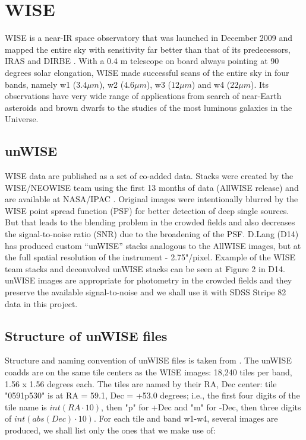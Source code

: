 \section{WISE}

WISE \citep{Wright2010} is a near-IR space observatory that was launched in December 2009 and mapped the entire sky with sensitivity far better than that of its predecessors, IRAS \citep{Neugebauer1984} and DIRBE \citep{Silverberg1993}. With a 0.4 m telescope on board always pointing at 90 degrees solar elongation, WISE made successful scans of the entire sky in four bands, namely w1 ($3.4 \mu m$), w2 ($4.6 \mu m$), w3 ($12 \mu m$) and w4 ($22 \mu m$). Its observations have very wide range of applications from search of near-Earth asteroids and brown dwarfs to the studies of the most luminous galaxies in the Universe.

\subsection{unWISE}

WISE data are published as a set of co-added data. Stacks were created by the WISE/NEOWISE team using the first 13 months of data (AllWISE release) and are available at NASA/IPAC . Original images were intentionally blurred by the WISE point spread function (PSF) for better detection of deep single sources. But that leads to the blending problem in the crowded fields and also decreases the signal-to-noise ratio (SNR) due to the broadening of the PSF. D.Lang \citep{Lang2014e} (D14) has produced custom “unWISE” stacks analogous to the AllWISE images, but at the full spatial resolution of the instrument - 2.75"/pixel. Example of the WISE team stacks and deconvolved unWISE stacks can be seen at Figure 2 in D14. unWISE images are appropriate for photometry in the crowded fields and they preserve the available signal-to-noise and we shall use it with SDSS Stripe 82 data in this project.

\subsection{Structure of unWISE files}

Structure and naming convention of unWISE files is taken from . The unWISE coadds are on the same tile centers as the WISE images: 18,240 tiles per band, 1.56 x 1.56 degrees each. The tiles are named by their RA, Dec center: tile "0591p530" is at RA = 59.1, Dec = +53.0 degrees; i.e., the first four digits of the tile name is $int(RA \cdot 10)$, then "p" for +Dec and "m" for -Dec, then three digits of $int(abs(Dec)\cdot 10)$. For each tile and band w1-w4, several images are produced, we shall list only the ones that we make use of:

